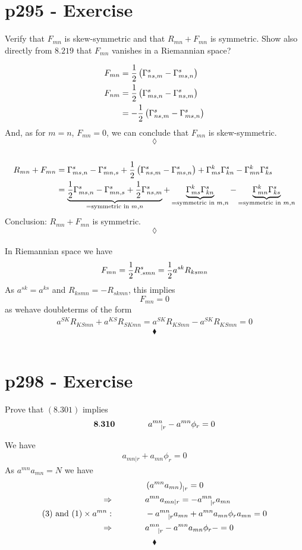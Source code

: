 \section{p295 - Exercise}
\begin{tcolorbox}
Verify that $F_{mn}$ is skew-symmetric and that $R_{mn}+F_{mn}$ is symmetric. Show also directly from $8.219$ that $F_{mn}$ vanishes in a Riemannian space?
\end{tcolorbox}
\begin{align*}
F_{mn} &= \frac{1}{2}\left( \Gamma^s_{ns,m}-\Gamma^s_{ms,n} \right)\\
F_{nm} &= \frac{1}{2}\left( \Gamma^s_{ms,n}-\Gamma^s_{ns,m} \right)\\
&= -\frac{1}{2}\left( \Gamma^s_{ns,m}-\Gamma^s_{ms,n} \right)
\end{align*}
And, as for $m=n$, $F_{mn} = 0$, we can conclude that $F_{mn}$ is skew-symmetric.
$$\lozenge$$\\
\begin{align*}
R_{mn} +F_{mn} &=  \Gamma^s_{ms,n}-\Gamma^s_{mn,s}+\frac{1}{2}\left( \Gamma^s_{ns,m}-\Gamma^s_{ms,n} \right)+\Gamma^k_{ms}\Gamma^s_{kn}-\Gamma^k_{mn}\Gamma^s_{ks}\\
&=  \underbrace{\frac{1}{2} \Gamma^s_{ms,n}-\Gamma^s_{mn,s}+\frac{1}{2} \Gamma^s_{ns,m}}_{=\text{symmetric in } m,n} +\underbrace{\Gamma^k_{ms}\Gamma^s_{kn}}_{=\text{symmetric in } m,n}-\underbrace{\Gamma^k_{mn}\Gamma^s_{ks}}_{=\text{symmetric in } m,n}\\
\end{align*}
Conclusion: $R_{mn} +F_{mn}$ is symmetric.
$$\lozenge$$\\
In Riemannian space we have $$F_{mn} = \frac{1}{2} R^s_{.smn} = \frac{1}{2} a^{sk}R_{ksmn}$$
As $a^{sk}= a^{ks}$ and $R_{ksmn}= - R_{skmn}$, this implies
$$F_{mn}=0$$ as wehave doubleterms of the form
\begin{align*}
a^{SK}R_{KSmn} + a^{KS}R_{SKmn} = a^{SK}R_{KSmn} - a^{SK}R_{KSmn} = 0
\end{align*}
$$\blacklozenge$$\\
\newpage

\section{p298 - Exercise}
\begin{tcolorbox}
Prove that $\mathbf{(8.301)}$ implies
$$\mathbf{8.310}\quad\quad\quad\quad a^{mn}_{\quad |r} - a^{mn}\phi_r=0$$
\end{tcolorbox}
We have 
\begin{align}
 a_{mn|r} + a_{mn}\phi_r=0
 \end{align}
 As $a^{mn}a_{mn}= N$ we have 
 \begin{align}
 &\left(a^{mn}a_{mn}\right)_{|r}=0\\
 \Rightarrow \quad\quad\quad\quad &a^{mn}a_{mn|r}=-a^{mn}_{\quad |r}a_{mn}\\
 (3) \text{ and } (1) \times a^{mn}:\quad\quad\quad\quad &-a^{mn}_{\quad |r}a_{mn}+ a^{mn}a_{mn}\phi_ra_{mn}=0\\
 \Rightarrow \quad\quad\quad\quad &a^{mn}_{\quad |r}-a^{mn}a_{mn}\phi_r-=0
 \end{align}
$$\blacklozenge$$\\

